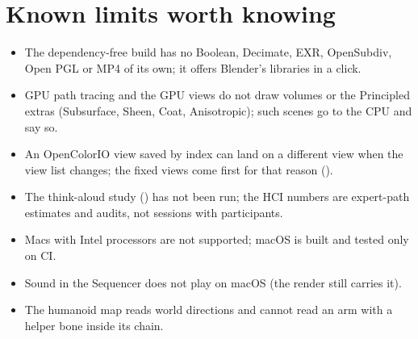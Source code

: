 \section{Known limits worth knowing}
\begin{itemize}
  \item The dependency-free build has no Boolean, Decimate, EXR, OpenSubdiv, Open PGL or MP4 of its own; it offers
    Blender's libraries in a click.
  \item GPU path tracing and the GPU views do not draw volumes or the Principled extras (Subsurface, Sheen, Coat,
    Anisotropic); such scenes go to the CPU and say so.
  \item An OpenColorIO view saved by index can land on a different view when the view list changes; the fixed views
    come first for that reason ().
  \item The think-aloud study () has not been run; the HCI numbers are expert-path
    estimates and audits, not sessions with participants.
  \item Macs with Intel processors are not supported; macOS is built and tested only on CI.
  \item Sound in the Sequencer does not play on macOS (the render still carries it).
  \item The humanoid map reads world directions and cannot read an arm with a helper bone inside its chain.
\end{itemize}
